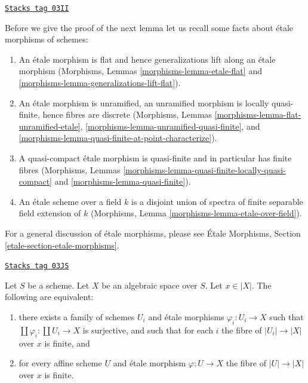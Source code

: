 \begin{remark}[Recall]
\label{decent-spaces-remark-recall}
\href{https://stacks.math.columbia.edu/tag/03II}{\texttt{Stacks tag 03II}}

Before we give the proof of the next lemma let us recall some facts
about \'etale morphisms of schemes:
\begin{enumerate}
\item An \'etale morphism is flat and hence generalizations lift along
an \'etale morphism
(Morphisms, Lemmas \ref{morphisms-lemma-etale-flat}
and \ref{morphisms-lemma-generalizations-lift-flat}).
\item An \'etale morphism is unramified, an unramified morphism is locally
quasi-finite, hence fibres are discrete
(Morphisms, Lemmas \ref{morphisms-lemma-flat-unramified-etale},
\ref{morphisms-lemma-unramified-quasi-finite}, and
\ref{morphisms-lemma-quasi-finite-at-point-characterize}).
\item A quasi-compact \'etale morphism is quasi-finite and in particular
has finite fibres
(Morphisms, Lemmas \ref{morphisms-lemma-quasi-finite-locally-quasi-compact} and
\ref{morphisms-lemma-quasi-finite}).
\item An \'etale scheme over a field $k$ is a disjoint union of spectra
of finite separable field extension of $k$
(Morphisms, Lemma \ref{morphisms-lemma-etale-over-field}).
\end{enumerate}
For a general discussion of \'etale morphisms, please see
\'Etale Morphisms, Section \ref{etale-section-etale-morphisms}.
\end{remark}

\begin{lemma}
\label{decent-spaces-lemma-U-finite-above-x}
\href{https://stacks.math.columbia.edu/tag/03JS}{\texttt{Stacks tag 03JS}}

Let $S$ be a scheme. Let $X$ be an algebraic space over $S$.
Let $x \in |X|$. The following are equivalent:
\begin{enumerate}
\item there exists a family of schemes $U_i$ and
\'etale morphisms $\varphi_i : U_i \to X$ such that
$\coprod \varphi_i : \coprod U_i \to X$ is surjective,
and such that for each $i$ the fibre of
$|U_i| \to |X|$ over $x$ is finite, and
\item for every affine scheme $U$ and \'etale morphism $\varphi : U \to X$
the fibre of $|U| \to |X|$ over $x$ is finite.
\end{enumerate}
\end{lemma}

